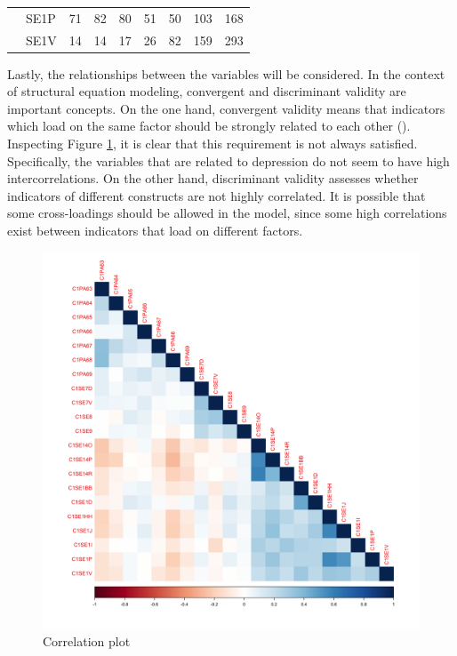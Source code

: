 \documentclass[11pt]{article}
\begin{document}
\begin{table}[h!]
{\begin{tabular}{|l|l|lllllll|}
                                    & SE1P                           & \multicolumn{1}{l|}{71}         & \multicolumn{1}{l|}{82}         & \multicolumn{1}{l|}{80}         & \multicolumn{1}{l|}{51}         & \multicolumn{1}{l|}{50}         & \multicolumn{1}{l|}{103}       & 168       \\ \cline{2-9} 
                                    & SE1V                           & \multicolumn{1}{l|}{14}         & \multicolumn{1}{l|}{14}         & \multicolumn{1}{l|}{17}         & \multicolumn{1}{l|}{26}         & \multicolumn{1}{l|}{82}         & \multicolumn{1}{l|}{159}       & 293       \\ \hline
\end{tabular}
}
\end{table}

Lastly, the relationships between the variables will be considered.
In the context of structural equation modeling, convergent and discriminant validity are important concepts.
On the one hand, convergent validity means that indicators which load on the same factor should be strongly related to each other (\cite{brown2015}).
Inspecting Figure \ref{fig:corr}, it is clear that this requirement is not always satisfied.
Specifically, the variables that are related to depression do not seem to have high intercorrelations.
On the other hand, discriminant validity assesses whether indicators of different constructs are not highly correlated.
It is possible that some cross-loadings should be allowed in the model, since some high correlations exist between indicators that load on different factors.

\begin{figure}[h!]
\centering
\includegraphics[width=14cm]{../visualizations/corr.png}
\caption{Correlation plot}
\label{fig:corr}
\end{figure}
\end{document}
